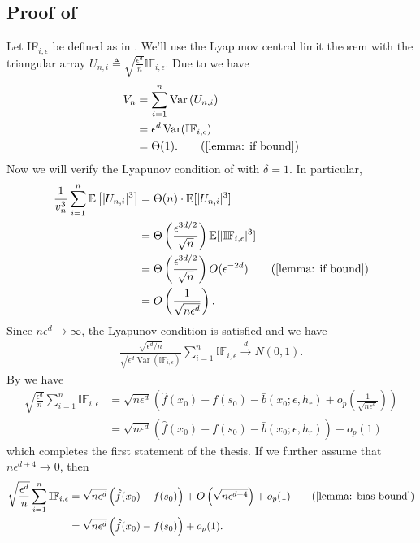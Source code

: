 \documentclass[11pt]{article}
\begin{document}
\begin{appendices}
\subsection{Proof of } \label{sec: proof of f clt}
Let IF$_{i, \epsilon}$ be defined as in . We'll use the Lyapunov central limit theorem  with the triangular array $U_{n, i}\triangleq \sqrt{\frac{\epsilon^d}{n}}\mathbb{IF}_{i, \epsilon}.$ Due to  we have
\begin{align*}
    V_n &= \sum_{i = 1}^n\operatorname{Var}\left(U_{n, i}\right)\\ 
    &= \epsilon^d\operatorname{Var}(\mathbb{IF}_{i, \epsilon}) \\
    &= \Theta(1). \tag{\Cref{lemma: if bound}}
\end{align*}
Now we will verify the Lyapunov condition of  with $\delta = 1$. In particular,
\begin{align*}
    \frac{1}{v_n^{3}}\sum_{i = 1}^n \mathbb{E}\left[|U_{n, i}|^{3}\right] &= \Theta(n)\cdot \mathbb{E}[|U_{n, i}|^3] \\
    &= \Theta\left(\frac{\epsilon^{3d/2}}{\sqrt{n}}\right)\mathbb{E}[|\mathbb{IF}_{i, \epsilon}|^3] \\
    &= \Theta\left(\frac{\epsilon^{3d/2}}{\sqrt{n}}\right)O(\epsilon^{-2d}) \tag{\Cref{lemma: if bound}} \\
    &= O\left(\frac{1}{\sqrt{n\epsilon^d}}\right).
\end{align*}
Since $n\epsilon^d \rightarrow \infty$, the Lyapunov condition is satisfied and we have
\begin{align*}
    \frac{\sqrt{\epsilon^d/n}}{\sqrt{\epsilon^d\operatorname{Var}(\mathbb{IF}_{i, \epsilon})}}\sum_{i = 1}^n\mathbb{IF}_{i, \epsilon} \overset{d}{\rightarrow} N(0, 1).
\end{align*}
By  we have 
\begin{align*}
    \sqrt{\frac{\epsilon^d}{n}} \sum_{i = 1}^n\mathbb{IF}_{i, \epsilon} &= \sqrt{n\epsilon^d}\left(\hat{f}(x_0) - f(s_0) - \bar{b}(x_0; \epsilon, h_r) + o_p\left(\frac{1}{\sqrt{n\epsilon^d}}\right)\right) \\
    &= \sqrt{n\epsilon^d}\left(\hat{f}(x_0) - f(s_0) - \bar{b}(x_0; \epsilon, h_r)\right) + o_p(1)
\end{align*}
which completes the first statement of the thesis. If we further assume that $n\epsilon^{d+4} \rightarrow 0$, then
\begin{align*}
    \sqrt{\frac{\epsilon^d}{n}} \sum_{i = 1}^n\mathbb{IF}_{i, \epsilon}
    &= \sqrt{n\epsilon^d}\left(\hat{f}(x_0) - f(s_0)\right)
    + O\left(\sqrt{n\epsilon^{d+4}}\right) + o_p(1) \tag{\Cref{lemma: bias bound}} \\
    &= \sqrt{n\epsilon^d}\left(\hat{f}(x_0) - f(s_0)\right) + o_p(1).
\end{align*}


\end{appendices}
\end{document}
